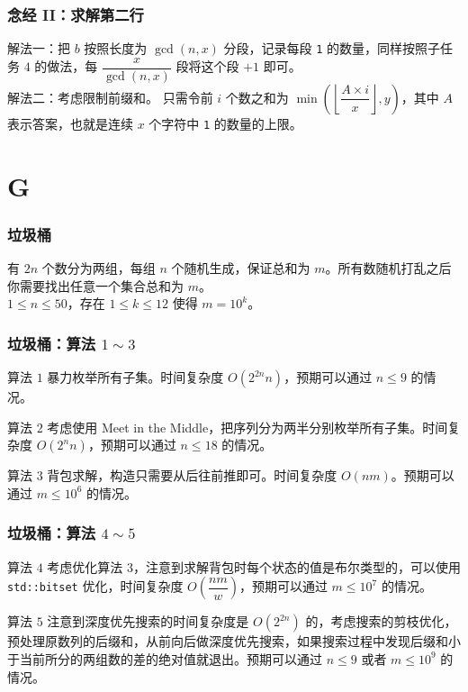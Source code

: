 \documentclass{beamer}
\begin{document}
\begin{frame}
\frametitle{念经 II：求解第二行}
解法一：把 $b$ 按照长度为 $\gcd(n,x)$ 分段，记录每段 \texttt{1} 的数量，同样按照子任务 $4$ 的做法，每 $\dfrac{x}{\gcd(n,x)}$ 段将这个段 $+1$ 即可。\\
\pause
解法二：考虑限制前缀和。
\pause
只需令前 $i$ 个数之和为 $\min\left(\left\lfloor\dfrac{A \times i}{x}\right\rfloor, y\right)$，其中 $A$ 表示答案，也就是连续 $x$ 个字符中 \texttt{1} 的数量的上限。
\end{frame}

\section{G}

\begin{frame}
\frametitle{垃圾桶}
有 $2n$ 个数分为两组，每组 $n$ 个随机生成，保证总和为 $m$。所有数随机打乱之后你需要找出任意一个集合总和为 $m$。\\
$1 \leq n \leq 50$，存在 $1 \leq k \leq 12$ 使得 $m = 10^k$。
\end{frame}

\begin{frame}
\frametitle{垃圾桶：算法 $1 \sim 3$}
\begin{block}{算法 $1$}
暴力枚举所有子集。时间复杂度 $O(2^{2n} n)$，预期可以通过 $n \leq 9$ 的情况。
\end{block}
\pause
\begin{block}{算法 $2$}
考虑使用 Meet in the Middle，把序列分为两半分别枚举所有子集。时间复杂度 $O(2^n n)$，预期可以通过 $n \leq 18$ 的情况。
\end{block}
\pause
\begin{block}{算法 $3$}
背包求解，构造只需要从后往前推即可。时间复杂度 $O(nm)$。预期可以通过 $m \leq 10^6$ 的情况。
\end{block}
\end{frame}

\begin{frame}
\frametitle{垃圾桶：算法 $4 \sim 5$}
\begin{block}{算法 $4$}
考虑优化算法 $3$，注意到求解背包时每个状态的值是布尔类型的，可以使用 \texttt{std::bitset} 优化，时间复杂度 $O\left( \dfrac{nm}{w} \right)$，预期可以通过 $m \leq 10^7$ 的情况。
\end{block}
\pause
\begin{block}{算法 $5$}
注意到深度优先搜索的时间复杂度是 $O(2^{2n})$ 的，考虑搜索的剪枝优化，预处理原数列的后缀和，从前向后做深度优先搜索，如果搜索过程中发现后缀和小于当前所分的两组数的差的绝对值就退出。预期可以通过 $n \leq 9$ 或者 $m \leq 10^9$ 的情况。
\end{block}
\end{frame}
\end{document}
